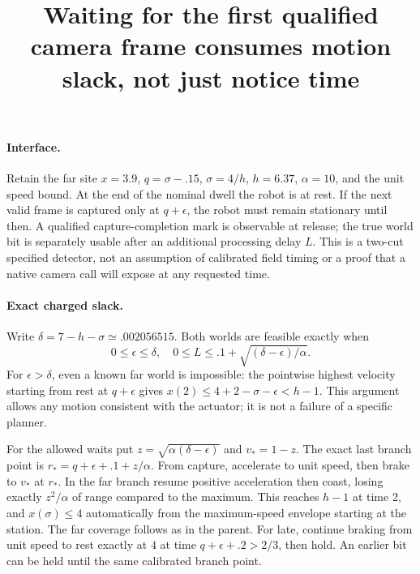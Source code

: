\documentclass{article}
\begin{document}
\title{Waiting for the first qualified camera frame consumes motion slack, not just notice time}
\maketitle

\paragraph{Interface.}
Retain the far site $x=3.9$, $q=\sigma-.15$, $\sigma=4/h$,
$h=6.37$, $\alpha=10$, and the unit speed bound. At the end of the
nominal dwell the robot is at rest. If the next valid frame is
captured only at $q+\epsilon$, the robot must remain stationary
until then. A qualified capture-completion mark is observable at
release; the true world bit is separately usable after an additional
processing delay $L$. This is a two-cut specified detector, not an
assumption of calibrated field timing or a proof that a native
camera call will expose at any requested time.

\paragraph{Exact charged slack.}
Write $\delta=7-h-\sigma\simeq .002056515$. Both worlds are
feasible exactly when
\[
  0\le\epsilon\le\delta,\quad
 0\le L \le .1 + \sqrt{(\delta-\epsilon)/\alpha}.
\]
For $\epsilon>\delta$, even a known far world is impossible:
the pointwise highest velocity starting from rest at $q+\epsilon$
gives $x(2)\le4+2-\sigma-\epsilon<h-1$. This argument allows
any motion consistent with the actuator; it is not a failure
of a specific planner.

For the allowed waits put $z=\sqrt{\alpha(\delta-\epsilon)}$ and
$v_*=1-z$. The exact last branch point is
$r_*=q+\epsilon+.1+z/\alpha$. From capture, accelerate to unit
speed, then brake to $v_*$ at $r_*$. In the far branch resume
positive acceleration then coast, losing exactly $z^2/\alpha$
of range compared to the maximum. This reaches $h-1$ at time 2,
and $x(\sigma)\le4$ automatically from the maximum-speed envelope
starting at the station. The far coverage follows as in the parent.
For late, continue braking from unit speed to rest exactly at $4$
at time $q+\epsilon+.2>2/3$, then hold. An earlier bit can be
held until the same calibrated branch point.
\end{document}
